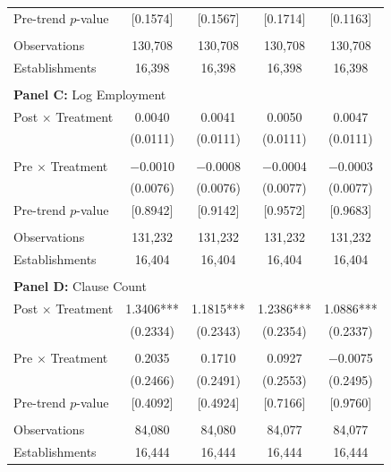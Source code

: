 \begin{table}[H]
\begin{threeparttable}
\begin{tabular}{lcccc}
Pre-trend $p$-value & [0.1574] & [0.1567] & [0.1714] & [0.1163] \\
  &  &  &  & \\
Observations & 130{,}708 & 130{,}708 & 130{,}708 & 130{,}708 \\
Establishments & 16{,}398 & 16{,}398 & 16{,}398 & 16{,}398 \\
  &  &  &  & \\
\midrule
\multicolumn{5}{l}{\textbf{Panel C:} Log Employment} \\
\midrule
Post $\times$ Treatment & 0.0040 & 0.0041 & 0.0050 & 0.0047 \\
  & (0.0111) & (0.0111) & (0.0111) & (0.0111) \\
  &  &  &  & \\
Pre $\times$ Treatment & $-$0.0010 & $-$0.0008 & $-$0.0004 & $-$0.0003 \\
  & (0.0076) & (0.0076) & (0.0077) & (0.0077) \\
Pre-trend $p$-value & [0.8942] & [0.9142] & [0.9572] & [0.9683] \\
  &  &  &  & \\
Observations & 131{,}232 & 131{,}232 & 131{,}232 & 131{,}232 \\
Establishments & 16{,}404 & 16{,}404 & 16{,}404 & 16{,}404 \\
  &  &  &  & \\
\midrule
\multicolumn{5}{l}{\textbf{Panel D:} Clause Count} \\
\midrule
Post $\times$ Treatment & 1.3406*** & 1.1815*** & 1.2386*** & 1.0886*** \\
  & (0.2334) & (0.2343) & (0.2354) & (0.2337) \\
  &  &  &  & \\
Pre $\times$ Treatment & 0.2035 & 0.1710 & 0.0927 & $-$0.0075 \\
  & (0.2466) & (0.2491) & (0.2553) & (0.2495) \\
Pre-trend $p$-value & [0.4092] & [0.4924] & [0.7166] & [0.9760] \\
  &  &  &  & \\
Observations & 84{,}080 & 84{,}080 & 84{,}077 & 84{,}077 \\
Establishments & 16{,}444 & 16{,}444 & 16{,}444 & 16{,}444 \\
\bottomrule
\end{tabular}
\scriptsize
\begin{tablenotes}

\end{tablenotes}
\end{threeparttable}
\end{table}
